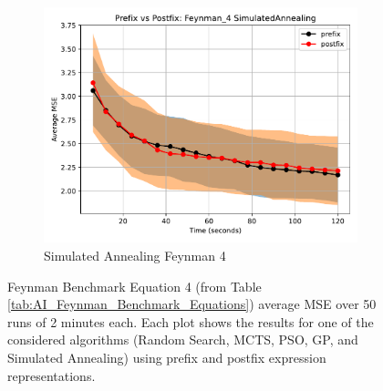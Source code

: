 \documentclass[12pt]{iopart}
\begin{document}
\begin{figure}
    \vspace{0.5cm}
    
    \begin{subfigure}[b]{0.4\textwidth}
        \includegraphics[width=\linewidth, keepaspectratio]{AIFeynman_Benchmarks/PrePostFeynman_4SimulatedAnnealing.pdf}
        \caption{Simulated Annealing Feynman 4}
        \label{subfig:feynman_4_SA}
    \end{subfigure}
    
    \caption{Feynman Benchmark Equation 4 (from Table \ref{tab:AI_Feynman_Benchmark_Equations}) average MSE over 50 runs of 2 minutes each. Each plot shows the results for one of the considered algorithms (Random Search, MCTS, PSO, GP, and Simulated Annealing) using prefix and postfix expression representations.}
    \label{fig:AIFeynman_4_Benchmarks}
\end{figure}
\end{document}
